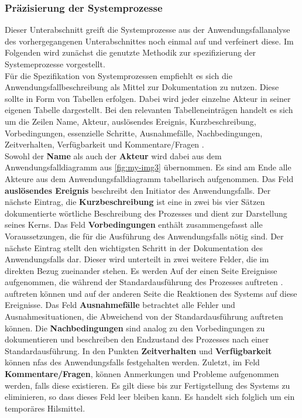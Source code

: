 \documentclass[../../../Bachelorarbeit.tex]{subfiles}
\begin{document}
\subsubsection{Präzisierung der Systemprozesse} \label{AnwfallSpezPraez}
Dieser Unterabschnitt greift die Systemprozesse aus der Anwendungsfallanalyse des vorhergegangenen Unterabschnittes noch einmal auf und verfeinert diese. Im Folgenden wird zunächst die genutzte Methodik zur spezifizierung der Systemeprozesse vorgestellt.\\
Für die Spezifikation von Systemprozessen empfiehlt es sich die Anwendungsfallbeschreibung als Mittel zur Dokumentation zu nutzen. Diese sollte in Form von Tabellen erfolgen. Dabei wird jeder einzelne Akteur in seiner eigenen Tabelle dargestellt. Bei den relevanten Tabelleneinträgen handelt es sich um die Zeilen Name, Akteur, auslösendes Ereignis, Kurzbeschreibung, Vorbedingungen, essenzielle Schritte, Ausnahmefälle, Nachbedingungen, Zeitverhalten, Verfügbarkeit und Kommentare/Fragen \cite[227]{Broy2021}.\\
Sowohl der \textbf{Name} als auch der \textbf{Akteur} wird dabei aus dem Anwendungsfalldiagramm aus \autoref{fig:my-img3} übernommen. Es sind am Ende alle Akteure aus dem Anwendungsfalldiagramm tabellarisch aufgenommen. Das Feld \textbf{auslösendes Ereignis} beschreibt den Initiator des Anwendungsfalls. Der nächste Eintrag, die \textbf{Kurzbeschreibung} ist eine in zwei bis vier Sätzen dokumentierte wörtliche Beschreibung des Prozesses und dient zur Darstellung seines Kerns. Das Feld \textbf{Vorbedingungen} enthält zusammengefasst alle Voraussetzungen, die für die Ausführung des Anwendungsfalls nötig sind. Der nächste Eintrag stellt den wichtigsten Schritt in der Dokumentation des Anwendungsfalls dar. Dieser wird unterteilt in zwei weitere Felder, die im direkten Bezug zueinander stehen. Es werden Auf der einen Seite Ereignisse aufgenommen, die während der Standardausführung des Prozesses auftreten \bzw. auftreten können und auf der anderen Seite die Reaktionen des Systems auf diese Ereignisse. Das Feld \textbf{Ausnahmefälle} betrachtet alle Fehler und Ausnahmesituationen, die Abweichend von der Standardausführung auftreten können. Die \textbf{Nachbedingungen} sind analog zu den Vorbedingungen zu dokumentieren und beschreiben den Endzustand des Prozesses nach einer Standardausführung. In den Punkten \textbf{Zeitverhalten} und \textbf{Verfügbarkeit} können \acp{nfa} des Anwendungsfalls festgehalten werden. Zuletzt, im Feld \textbf{Kommentare/Fragen}, können Anmerkungen und Probleme aufgenommen werden, falls diese existieren. Es gilt diese bis zur Fertigstellung des Systems zu eliminieren, so dass dieses Feld leer bleiben kann. Es handelt sich folglich um ein temporäres Hilsmittel.\\
\end{document}
